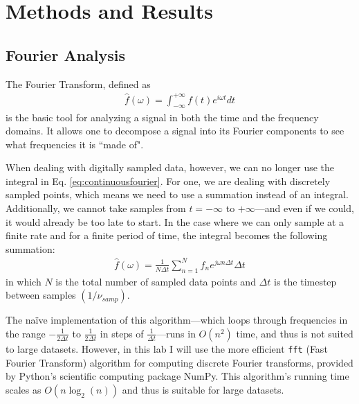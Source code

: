 \documentclass[12pt]{article}
\begin{document}

\section{Methods and Results}

\subsection{Fourier Analysis}
The Fourier Transform, defined as
\begin{eqnarray}
\hat{f}(\omega) = \int_{-\infty}^{+\infty}f(t)e^{i\omega t} dt \label{eq:continuousfourier}
\end{eqnarray}
is the basic tool for analyzing a signal in both the time and the frequency domains. It allows one to decompose a signal into its Fourier components to see what frequencies it is ``made of".

When dealing with digitally sampled data, however, we can no longer use the integral in Eq. \ref{eq:continuousfourier}. For one, we are dealing with discretely sampled points, which means we need to use a summation instead of an integral. Additionally, we cannot take samples from $t=-\infty$ to $+\infty$---and even if we could, it would already be too late to start. In the case where we can only sample at a finite rate and for a finite period of time, the integral becomes the following summation:
\begin{eqnarray}
\hat{f}(\omega) = \frac{1}{N\Delta{t}}\sum_{n=1}^{N} f_n e^{j\omega n \Delta{t}} \Delta{t}
\end{eqnarray}
in which $N$ is the total number of sampled data points and $\Delta{t}$ is the timestep between samples $\left( 1/\nu_{samp} \right)$.

The na\"{i}ve implementation of this algorithm---which loops through frequencies in the range $-\frac{1}{2\Delta{t}}$ to $\frac{1}{2\Delta{t}}$ in steps of $\frac{1}{\Delta{t}}$---runs in $O\left(n^2\right)$ time, and thus is not suited to large datasets. However, in this lab I will use the more efficient \texttt{fft} (Fast Fourier Transform) algorithm for computing discrete Fourier transforms, provided by Python's scientific computing package NumPy. This algorithm's running time scales as $O\left( n \log_2(n) \right)$ and thus is suitable for large datasets.
\end{document}
